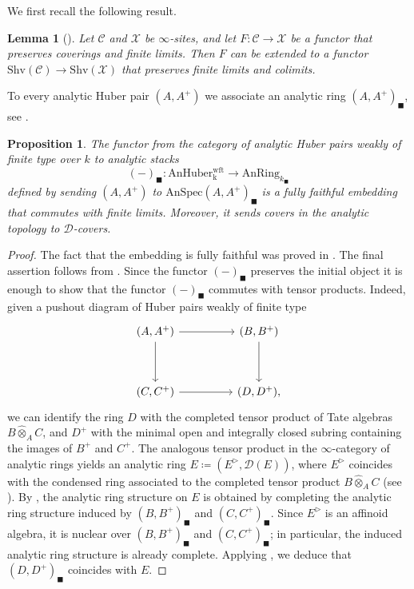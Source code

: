 \documentclass[oneside, hidelinks, 12pt, a4paper,reqno]{amsart}
\theoremstyle{plain}
\theoremstyle{definition}
\theoremstyle{plain}
\newtheorem{lemma}[lemma]{Lemma}
\newtheorem{proposition}[proposition]{Proposition}
\newcommand{\cat}{$\infty$-category }
\newcommand{\Solid}{\blacksquare}
\begin{document}
We first recall the following result.

\begin{lemma}[{\cite[Lemma 2.14]{porta2016higheranalyticstacksgaga}}]\label{lem: colimit preserving functor sheaves}
    Let $\mathscr{C}$ and $\mathscr{X}$ be $\infty$-sites, and let $F\colon \mathscr{C} \to \mathscr{X}$ be a functor that preserves coverings and finite limits. Then $F$ can be extended to a functor   $\mathrm{Shv}(\mathscr{C}) \to \mathrm{Shv}(\mathscr{X})$ that preserves finite limits and colimits. 
\end{lemma}

To every analytic Huber pair $(A,A^+)$ we associate an analytic ring $(A,A^+)_\Solid$, see \cite[Theorem 3.28]{andreychev2021pseudocoherent}.

\begin{proposition}
    The functor from the category of analytic Huber pairs weakly of finite type over $k$ to analytic stacks
    \[
    (-)_\Solid \colon\mathrm{AnHuber_{\text{k}}^{wft}} \to \mathrm{AnRing}_{k_\Solid}
    \]
    defined by sending $(A,A^+)$ to $\mathrm{AnSpec}(A,A^+)_\Solid$ is a fully faithful embedding that commutes with finite limits. Moreover, it sends covers in the analytic topology to $\mathscr{D}$-covers. 
\end{proposition}
\begin{proof}
    The fact that the embedding is fully faithful was proved in \cite[Theorem 3.34]{andreychev2021pseudocoherent}. The final assertion follows from \cite[Lemma 3.2.9]{camargo2024analyticrhamstackrigid}. Since the functor $(-)_\Solid$ preserves the initial object it is enough to show that the functor $(-)_\Solid$ commutes with tensor products. Indeed, given a pushout diagram of Huber pairs weakly of finite type
    \[
    \begin{tikzcd}
	{(A,A^+)} && {(B,B^+)} \\
	\\
	{(C,C^+)} && {(D,D^+),}
	\arrow[from=1-1, to=1-3]
	\arrow[from=1-1, to=3-1]
	\arrow[from=1-3, to=3-3]
	\arrow[from=3-1, to=3-3]
\end{tikzcd}
    \]
    we can identify the ring $D$ with the completed tensor product of Tate algebras $B\widehat{\otimes}_A C$, and $D^+$ with the minimal open and integrally closed subring containing the images of $B^+$ and $C^{+}$. The analogous tensor product in the \cat of analytic rings yields an analytic ring $E\coloneqq(E^{\triangleright},\mathscr{D}(E))$, where $E^{\triangleright}$ coincides with the condensed ring associated to the completed tensor product $B\widehat{\otimes}_A C$ (see ). By \cite[Proposition 12.12]{analytic}, the analytic ring structure on $E$ is obtained by completing the analytic ring structure induced by $(B,B^+)_\Solid$ and $(C,C^+)_\Solid$. Since $E^\triangleright$ is an affinoid algebra, it is nuclear over $(B,B^+)_\Solid$ and $(C,C^+)_\Solid$; in particular, the induced analytic ring structure is already complete. Applying \cite[Proposition 3.32]{andreychev2021pseudocoherent}, we deduce that $(D,D^+)_\Solid$ coincides with $E$.
\end{proof}
\end{document}
